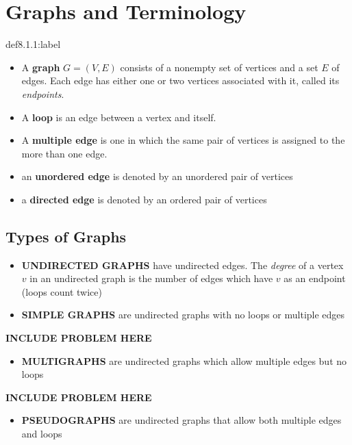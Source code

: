 \section{Graphs and Terminology}

\begin{definition}[Graphs]{def8.1.1:label}
    \begin{itemize}
        \item A \textbf{graph} $G=(V,E)$ consists of a nonempty set of vertices and a set $E$ of edges. Each edge has either one or two vertices associated with it, called its \textit{endpoints}. 
        \item A \textbf{loop} is an edge between a vertex and itself. 
        \item A \textbf{multiple edge} is one in which the same pair of vertices is assigned to the more than one edge.  
        \item an \textbf{unordered edge} is denoted by an unordered pair of vertices
        \item a \textbf{directed edge} is denoted by an ordered pair of vertices
    \end{itemize}
\end{definition}


\subsection{Types of Graphs}

\begin{itemize}
    \item \textbf{UNDIRECTED GRAPHS} have undirected edges. The \textit{degree} of a vertex $v$ in an undirected graph is the number of edges which have $v$ as an endpoint (loops count twice)
    \item \textbf{SIMPLE GRAPHS} are undirected graphs with no loops or multiple edges
\end{itemize}

\textbf{INCLUDE PROBLEM HERE}

\begin{itemize}
    \item \textbf{MULTIGRAPHS} are undirected graphs which allow multiple edges but no loops
\end{itemize}

\textbf{INCLUDE PROBLEM HERE}

\begin{itemize}
    \item \textbf{PSEUDOGRAPHS} are undirected graphs that allow both multiple edges and loops
\end{itemize}

